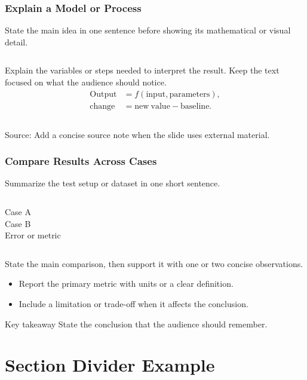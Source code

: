 \documentclass[10pt,compress,aspectratio=169]{beamer}
\begin{document}
\begin{frame}
\frametitle{Explain a Model or Process}
State the main idea in one sentence before showing its mathematical or visual detail.
\begin{columns}[T,onlytextwidth]
	\small
	Explain the variables or steps needed to interpret the result. Keep the text focused on what the audience should notice.
	\begin{align*}
	\mathrm{Output} &= f(\mathrm{input},\mathrm{parameters}),\\
	\mathrm{change} &= \mathrm{new\ value} - \mathrm{baseline}.
	\end{align*}
	\centering
\end{columns}
\vfill
{\tiny Source: Add a concise source note when the slide uses external material.}
\end{frame}

\begin{frame}
\frametitle{Compare Results Across Cases}
Summarize the test setup or dataset in one short sentence.
\begin{columns}[T,onlytextwidth]
	\centering
	\scriptsize Case A\\[0.3em]
	\centering
	\scriptsize Case B\\[0.3em]
	\centering
	\scriptsize Error or metric\\[0.3em]
\end{columns}
\vspace{0.4em}
\small
State the main comparison, then support it with one or two concise observations.
\begin{itemize}
	\footnotesize
	\item Report the primary metric with units or a clear definition.
	\item Include a limitation or trade-off when it affects the conclusion.
\end{itemize}
\begingroup
{}
\begin{block}{Key takeaway}
\small State the conclusion that the audience should remember.
\end{block}
\endgroup
\end{frame} 

\section{Section Divider Example}
\end{document}
